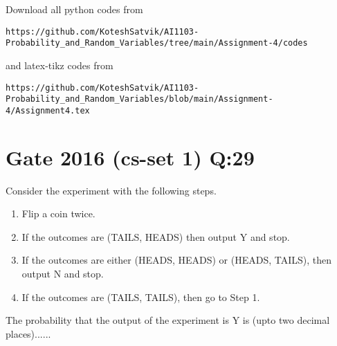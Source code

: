 \documentclass[journal,12pt,twocolumn]{IEEEtran}
\begin{document}
\author{Songa Kotesh Satvik}
\maketitle
\newpage
\bigskip
\renewcommand{\thefigure}{\theenumi}
\renewcommand{\thetable}{\theenumi}
Download all python codes from 
\begin{lstlisting}
https://github.com/KoteshSatvik/AI1103-Probability_and_Random_Variables/tree/main/Assignment-4/codes
\end{lstlisting}
%
and latex-tikz codes from 
%
\begin{lstlisting}
https://github.com/KoteshSatvik/AI1103-Probability_and_Random_Variables/blob/main/Assignment-4/Assignment4.tex
\end{lstlisting}
\section{\textbf{Gate 2016 (cs-set 1) Q:}29}
Consider the experiment with the following steps.
\begin{enumerate}
\item  Flip a coin twice.
\item If the outcomes are (TAILS, HEADS) then output Y and stop.
\item If the outcomes are either (HEADS, HEADS) or (HEADS, TAILS), then output N and stop.
\item If the outcomes are (TAILS, TAILS), then go to Step 1.
\end{enumerate}
The probability that the output of the experiment is Y is (upto two decimal places)......
\end{document}
